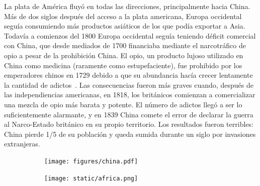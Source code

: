 \documentclass[a4paper,11pt]{book}
\theoremstyle{definition}
\newif\ifen
\newif\ifes
\newcommand{\en}[1]{\ifen#1\fi}
\newcommand{\es}[1]{\ifes#1\fi}
\begin{document}
La plata de América fluyó en todas las direcciones, principalmente hacia China.
Más de dos siglos después del acceso a la plata americana, Europa occidental seguía consumiendo más productos asiáticos de los que podía exportar a Asia.
Todavía a comienzos del 1800 Europa occidental seguía teniendo déficit comercial con China, que desde mediados de 1700 financiaba mediante el narcotráfico de opio a pesar de la prohibición China.
%
El opio, un producto lujoso utilizado en China como medicina (raramente como estupefaciente), fue prohibido por los emperadores chinos en 1729 debido a que su abundancia hacía crecer lentamente la cantidad de adictos~\cite{pomeranz2018-tradeCreated}.
%
Las consecuencias fueron más graves cuando, después de las independiencias americanas, en 1818, los británicos comienzan a comercializar una mezcla de opio más barata y potente.
%
El número de adictos llegó a ser lo suficientemente alarmante, y en 1839 China comete el error de declarar la guerra al Narco-Estado británico en su propio territorio.
%
Los resultados fueron terribles: China pierde 1/5 de su población y queda sumida durante un siglo por invasiones extranjeras.

\begin{figure}[ht!]
\centering
 \begin{subfigure}[b]{0.45\textwidth} \centering
  \texttt{[image: figures/china.pdf]}
  \caption{}
  \label{fig:china}
  \end{subfigure}
  \begin{subfigure}[b]{0.27\textwidth} \centering
  \texttt{[image: static/africa.png]}
  \caption{}
  \label{fig:africa}
  \end{subfigure}
 \caption{
 \en{(\subref{fig:china}): China's defeat against the British narco-state on its own territory had terrible consequences. (\subref{fig:africa}): It was not until 1850 that the colonization of continental Africa and the vast territories of the still autonomous Americas began.}%
 \es{(\subref{fig:china}): La derrota de China contra el narco-estado británico en su propio territorio tuvo consecuencias terribles. (\subref{fig:africa}): Recién a partir de 1850 comienza la colonización de África continental y los extensos territorios de América todavía autónomos.}%
 }
 \label{fig:eraDeGenocidios}
 \end{figure}
\end{document}
